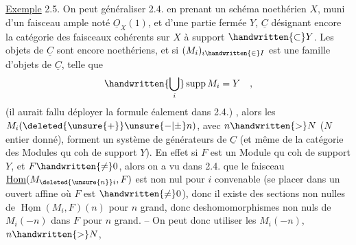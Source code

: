 \uline{Exemple} 2.5. On peut généraliser 2.4. en prenant un schéma 
noethérien $X$, muni d'un faisceau ample noté $\underline O_X(1)$,  et d'une
partie fermée $Y$, $\underline C$ désignant encore la catégorie des faisceaux cohérents
sur $X$ à support $\handwritten{\subset}Y$. Les objets de $\underline C$ sont encore noethériens, et si
$(M_i)_{i\handwritten{\in}I}$ est une famille d'objets de $\underline C$, telle que 
\[
\handwritten{\bigcup_i}\operatorname{supp}M_i=Y\quad,
\]
(il aurait fallu déployer la formule éalement dans 2.4.) , alors les
$M_i(\deleted{\unsure{+}}\unsure{-|\pm}n)$, avec $n\handwritten{>}N$ ($N$ entier donné), forment un système de générateurs
de $\underline C$ (et même de la catégorie des Modules qu coh de support $Y$). En effet
si $F$ est un Module qu coh de support $Y$, et $F\handwritten{\ne}0$, alors  on a vu
dans 2.4. que le faisceau $\underline{\operatorname{Hom}}(M_{\deleted{\unsure{n}}i},F)$ est non nul pour $i$ convenable (se placer dans un ouvert affine où $F$ est $\handwritten{\ne}0$), donc il existe des sections non
nulles de $\underline{\operatorname{Hom}}(M_i,F)(n)$ pour $n$ grand, donc des\handwritten{\unsure{/}}homomorphismes non nuls de
$M_i(-n)$ dans $F$ pour $n$ grand. -- On peut donc utiliser les $M_i(-n)$, $n\handwritten{>}N$,

